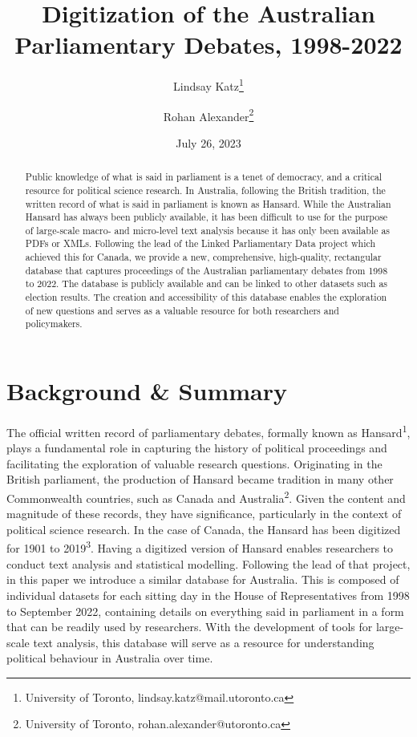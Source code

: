 \documentclass[
  letterpaper,
  DIV=11,
  numbers=noendperiod]{scrartcl}
\title{Digitization of the Australian Parliamentary Debates, 1998-2022}
\author{Lindsay Katz\footnote{University of Toronto,
  lindsay.katz@mail.utoronto.ca} \and Rohan Alexander\footnote{University
  of Toronto, rohan.alexander@utoronto.ca}}
\date{July 26, 2023}
\begin{document}
\maketitle
\begin{abstract}
Public knowledge of what is said in parliament is a tenet of democracy,
and a critical resource for political science research. In Australia,
following the British tradition, the written record of what is said in
parliament is known as Hansard. While the Australian Hansard has always
been publicly available, it has been difficult to use for the purpose of
large-scale macro- and micro-level text analysis because it has only
been available as PDFs or XMLs. Following the lead of the Linked
Parliamentary Data project which achieved this for Canada, we provide a
new, comprehensive, high-quality, rectangular database that captures
proceedings of the Australian parliamentary debates from 1998 to 2022.
The database is publicly available and can be linked to other datasets
such as election results. The creation and accessibility of this
database enables the exploration of new questions and serves as a
valuable resource for both researchers and policymakers.
\end{abstract}
\ifdefined\Shaded\renewenvironment{Shaded}{\begin{tcolorbox}[borderline west={3pt}{0pt}{shadecolor}, interior hidden, breakable, frame hidden, enhanced, sharp corners, boxrule=0pt]}{\end{tcolorbox}}\fi

\hypertarget{sec-intro}{%
\section{Background \& Summary}\label{sec-intro}}

The official written record of parliamentary debates, formally known as
Hansard\textsuperscript{1}, plays a fundamental role in capturing the
history of political proceedings and facilitating the exploration of
valuable research questions. Originating in the British parliament, the
production of Hansard became tradition in many other Commonwealth
countries, such as Canada and Australia\textsuperscript{2}. Given the
content and magnitude of these records, they have significance,
particularly in the context of political science research. In the case
of Canada, the Hansard has been digitized for 1901 to
2019\textsuperscript{3}. Having a digitized version of Hansard enables
researchers to conduct text analysis and statistical modelling.
Following the lead of that project, in this paper we introduce a similar
database for Australia. This is composed of individual datasets for each
sitting day in the House of Representatives from 1998 to September 2022,
containing details on everything said in parliament in a form that can
be readily used by researchers. With the development of tools for
large-scale text analysis, this database will serve as a resource for
understanding political behaviour in Australia over time.
\end{document}

